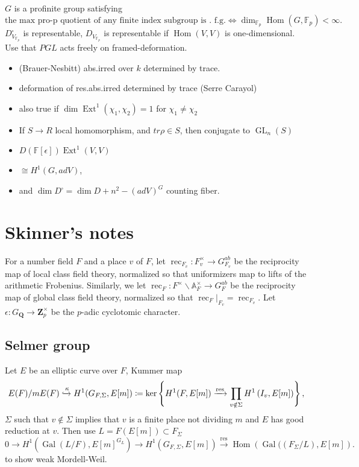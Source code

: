 \documentclass[leqno]{amsart}
\DeclareMathOperator{\GL}{GL}
\newcommand{\Q}{{\mathbf{Q}}}
\newcommand{\Zp}{\mathbf{Z}_p}
\DeclareMathOperator{\Gal}{Gal}
\newcommand{\1}{\mathbf{1}}
\DeclareMathOperator{\Ext}{Ext}
\DeclareMathOperator{\Hom}{Hom}
\DeclareMathOperator{\res}{res}
\DeclareMathOperator{\rec}{rec}
\theoremstyle{definition}
\theoremstyle{remark}
\begin{document}
$G$ is a profinite group satisfying 
 \[
	 \text{the max pro-p quotient of any finite index subgroup
	 is . f.g.}
	 \Longleftrightarrow
	 \dim_{\mathbb{F}_p}\Hom(G,\mathbb{F}_p)<\infty.
\]
$D^{\square}_{V_{\mathbb{F}_p}}$ is representable,
$D_{V_{\mathbb{F}_p}}$ is representable if $\Hom(V,V)$ is one-dimensional.
Use that  $PGL$ acts freely on framed-deformation.
\begin{itemize}
	 \item (Brauer-Nesbitt) abs.irred over $k$ determined by trace.
	 \item deformation of res.abs.irred determined by trace
		 (Serre Carayol)
	 \item also true if $\dim\Ext^1(\chi_1,\chi_2)=1$
		 for $\chi_1\neq \chi_2$
	 \item If $S\to R$ local homomorphism,
		 and  $tr\rho\in S$,
		 then conjugate to  $\GL_n(S)$
	 \item  $D(\mathbb{F}[\epsilon])\Ext^1(V,V)$
	 \item  $\cong H^1(G, adV)$, 
	 \item and  $\dim D^\square=\dim D+n^2-(ad V)^G$
		 counting fiber.
\end{itemize}
	




\section{Skinner's notes}

For a number field $F$ and a place $v$ of $F$,
let $\rec_{F_v}: F_v^{\times} \rightarrow G_{F_v}^{ab}$ 
be the reciprocity map of local class field theory, 
normalized so that uniformizers map to lifts of the arithmetic Frobenius. 
Similarly, we let $\rec_F: F^{\times} \backslash \mathbb{A}_F^{\times} \rightarrow G_F^{ab}$ 
be the reciprocity map of global class field theory, normalized so that 
$\rec_F\vert_{F_v}=\rec_{F_v}$.
Let $\epsilon:G_\Q\to \Zp^\times$ be the $p$-adic cyclotomic character.

\subsection{Selmer group}
Let $E$ be an elliptic curve over $F$,
Kummer map
\[
    E(F)/mE(F)\xhookrightarrow{\kappa}
    H^1(G_{F,\Sigma},E[m])\coloneqq
    \ker\left\{H^1(F, E[m]) 
    \xrightarrow{\res} \prod_{v \notin \Sigma} H^1\left(I_v, E[m]\right)\right\},
\]
$\Sigma$ such that $v\notin \Sigma$ implies
that $v$ is a finite place not dividing $m$ and $E$ has good reduction at $v$.
Then use $L=F(E[m])\subset F_\Sigma$
\[
    0 \rightarrow H^1\left(\Gal(L / F), E[m]^{G_L}\right) \rightarrow H^1\left(G_{F, \Sigma}, E[m]\right) \xrightarrow{\res} \Hom\left(\Gal(\left(F_{\Sigma} / L\right), E[m]\right).
\]
to show weak Mordell-Weil.
\end{document}
